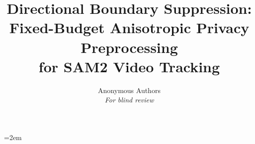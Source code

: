 \documentclass[10pt]{article}
\title{Directional Boundary Suppression:\\
       Fixed-Budget Anisotropic Privacy Preprocessing\\
       for SAM2 Video Tracking}
\author{
  Anonymous Authors\\
  \textit{For blind review}
}
\begin{document}
\emergencystretch=2em

\maketitle

\begin{abstract}
  
\end{abstract}











\end{document}
